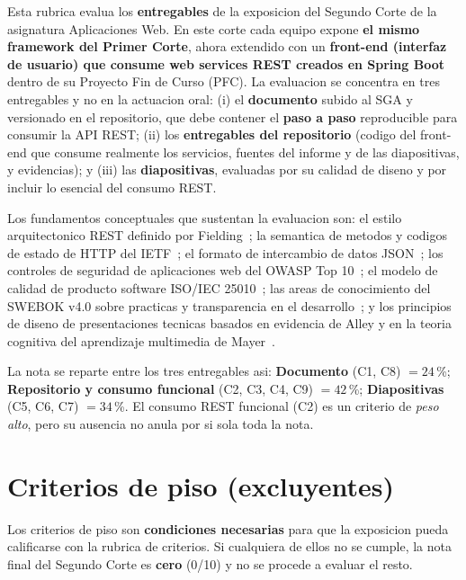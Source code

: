 \documentclass[11pt,a4paper]{article}
\begin{document}
Esta rubrica evalua los \textbf{entregables} de la exposicion del Segundo Corte de la asignatura Aplicaciones Web. En este corte cada equipo expone \textbf{el mismo framework del Primer Corte}, ahora extendido con un \textbf{front-end (interfaz de usuario) que consume web services REST creados en Spring Boot} dentro de su Proyecto Fin de Curso (PFC). La evaluacion se concentra en tres entregables y no en la actuacion oral: (i) el \textbf{documento} subido al SGA y versionado en el repositorio, que debe contener el \textbf{paso a paso} reproducible para consumir la API REST; (ii) los \textbf{entregables del repositorio} (codigo del front-end que consume realmente los servicios, fuentes del informe y de las diapositivas, y evidencias); y (iii) las \textbf{diapositivas}, evaluadas por su calidad de diseno y por incluir lo esencial del consumo REST.

Los fundamentos conceptuales que sustentan la evaluacion son: el estilo arquitectonico REST definido por Fielding~\cite{fielding2000rest}; la semantica de metodos y codigos de estado de HTTP del IETF~\cite{rfc9110http}; el formato de intercambio de datos JSON~\cite{rfc8259json}; los controles de seguridad de aplicaciones web del OWASP Top 10~\cite{owasp2021top10}; el modelo de calidad de producto software ISO/IEC 25010~\cite{iso25010}; las areas de conocimiento del SWEBOK v4.0 sobre practicas y transparencia en el desarrollo~\cite{washizaki2024swebok}; y los principios de diseno de presentaciones tecnicas basados en evidencia de Alley y en la teoria cognitiva del aprendizaje multimedia de Mayer~\cite{alley2013craft,mayer2009multimedia}.

La nota se reparte entre los tres entregables asi: \textbf{Documento} (C1, C8) $= 24$\,\%; \textbf{Repositorio y consumo funcional} (C2, C3, C4, C9) $= 42$\,\%; \textbf{Diapositivas} (C5, C6, C7) $= 34$\,\%. El consumo REST funcional (C2) es un criterio de \emph{peso alto}, pero su ausencia no anula por si sola toda la nota.

\section{Criterios de piso (excluyentes)}

Los criterios de piso son \textbf{condiciones necesarias} para que la exposicion pueda calificarse con la rubrica de criterios. Si cualquiera de ellos no se cumple, la nota final del Segundo Corte es \textbf{cero} (0/10) y no se procede a evaluar el resto.
\end{document}
